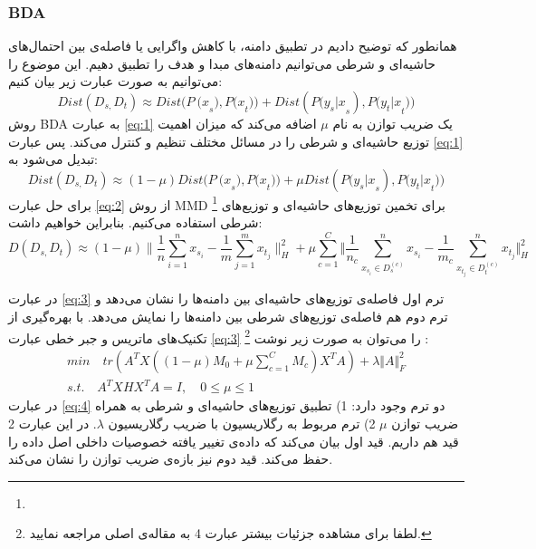 {{	 	\subsubsection{BDA}
	 	{
 		همانطور که توضیح دادیم در تطبیق دامنه، با کاهش واگرایی یا فاصله‌ی بین احتمال‌های حاشیه‌ای و شرطی می‌توانیم دامنه‌های مبدا و هدف را تطبیق دهیم. این موضوع را می‌توانیم به صورت عبارت زیر بیان کنیم:
 		\begin{equation}
 			Dist\left(D_{s,}D_t\right)\approx Dist{(P\ (x}_s),{P(x}_t))+Dist({P(y_s|x}_s),{P(y_t|x}_t))
 			\label{eq:1}
 		\end{equation}
 		روش BDA به عبارت 
 		\ref{eq:1}
 		 یک ضریب توازن به نام $\mu$ اضافه می‌کند که میزان اهمیت توزیع حاشیه‌ا‌ی و شرطی را در مسائل مختلف تنظیم و کنترل می‌کند. پس عبارت 
 		\ref{eq:1}
 		 تبدیل می‌شود به:
 		 \begin{equation}
 			Dist\left(D_{s,}D_t\right)\approx(1-\mu)Dist{(P\ (x}_s),{P(x}_t))+\mu Dist({P(y_s|x}_s),{P(y_t|x}_t))
 			\label{eq:2}
 		 \end{equation}
 		  برای حل عبارت 
 		  \ref{eq:2}
 		  از روش MMD 
 		  \footnote{}
 		  برای تخمین توزیع‌های حاشیه‌ای و توزیع‌های شرطی استفاده می‌کنیم. بنابراین خواهیم داشت:
 		  \begin{equation}
 		  	 D \left( D_{s,}D_{t} \right)  \approx  \left( 1- \mu  \right)  \bigg \|\frac{1}{n} \sum _{i=1}^{n}x_{s_{i}} - \frac{1}{m} \sum _{j=1}^{m}x_{t_{j}}\bigg \| _{H}^{2} + \mu \sum _{c=1}^{C} \bigg \Vert \frac{1}{n_{c}} \sum _{x_{s_{i}} \in  D_{s}^{ \left( c \right) }}^{n}x_{s_{i}} - \frac{1}{m_{c}} \sum _{x_{t_{j}} \in  D_{t}^{ \left( c \right) }}^{n}x_{t_{j}} \bigg \Vert _{H}^{2}
 		  	 \label{eq:3}
 		  \end{equation}
 		  
 		  در عبارت 
 		 \ref{eq:3}
 		  ترم اول فاصله‌ی توزیع‌های حاشیه‌ای بین دامنه‌ها را نشان می‌دهد و ترم دوم هم فاصله‌ی توزیع‌های شرطی بین دامنه‌ها را نمایش می‌دهد. با بهره‌گیری از تکنیک‌های ماتریس و جبر خطی عبارت 
 		 \ref{eq:3}
 		  را می‌توان به صورت زیر نوشت
 		  \footnote{لطفا برای مشاهده جزئیات بیشتر عبارت 4 به مقاله‌ی اصلی مراجعه نمایید.}
 		  :
 		  \begin{equation}
	 	  \begin{aligned}
		  min \quad tr \left( A^{T}X \left( \left( 1 - \mu \right) M_{0} + \mu \sum _{c=1\mathrm{ }}^{C}M_{c} \right) X^{T}A \right) + \lambda \Vert A \Vert_{F}^{2} \\
		  s.t. \quad A^{T}XHX^{T}A = I, \quad  0  \leq \mu \leq  1 \quad \quad \quad \quad \quad
		  \label{eq:4}
	 	  \end{aligned}
 		  \end{equation}
 		   در عبارت
 		   \ref{eq:4}
 		    دو ترم وجود دارد: 1) تطبیق توزیع‌های حاشیه‌ای و شرطی به همراه ضریب توازن $\mu$ 2) ترم مربوط به رگلاریسیون با ضریب رگلاریسیون $\lambda$. در این عبارت 2 قید هم داریم. قید اول بیان می‌کند که داده‌ی تغییر یافته خصوصیات داخلی اصل داده را حفظ می‌کند. قید دوم نیز بازه‌ی ضریب توازن را نشان می‌کند.
 		    
}}}
